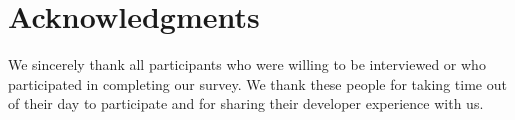 \documentclass[conference]{IEEEtran}
\begin{document}
\section{Acknowledgments}

We sincerely thank all participants who were willing to be interviewed or who participated
in completing our survey. We thank these people for taking time out of their day to participate and for
sharing their developer experience with us.




\end{document}
